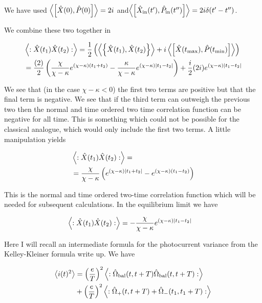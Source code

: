 \documentclass[12pt]{article}
\begin{document}
We have used $\Braket{\left[\hat{X}(0),\hat{P}(0) \right]} = 2i $ and$\Braket{\left[\hat{X}_{\text{in}}(t'),\hat{P}_{\text{in}}(t'') \right]} = 2i \delta(t' - t'')$.

We combine these two together in 

\begin{align}
&\Braket{:\hat{X}(t_1)\hat{X}(t_2) :} = \frac{1}{2}\left(\Braket{\left\{\hat{X}(t_1),\hat{X}(t_2) \right\}} + i \Braket{\left[\hat{X}(t_\text{max}),\hat{P}(t_{\text{min}}) \right]} \right)\\
&= \frac{(2)}{2}\left(\frac{\chi}{\chi-\kappa}e^{(\chi-\kappa)(t_1+t_2)} - \frac{\kappa}{\chi-\kappa} e^{(\chi-\kappa)|t_1-t_2|} \right) + \frac{i}{2}(2i) e^{(\chi-\kappa)|t_1-t_2|}\\
\end{align}

We see that (in the case $\chi-\kappa <0$) the first two terms are positive but that the final term is negative. We see that if the third term can outweigh the previous two then the normal and time ordered two time correlation function can be negative for all time. This is something which could not be possible for the classical analogue, which would only include the first two terms. A little manipulation yields

\begin{align}
&\Braket{:\hat{X}(t_1)\hat{X}(t_2) :} = \\
&= \frac{\chi}{\chi-\kappa} \left(e^{(\chi-\kappa)|t_1+t_2|} - e^{(\chi-\kappa)(t_1-t_2)} \right)
\end{align}

This is the normal and time ordered two-time correlation function which will be needed for subsequent calculations. In the equilibrium limit we have


\begin{align}
&\Braket{:\hat{X}(t_1)\hat{X}(t_2) :} = -\frac{\chi}{\chi-\kappa} e^{(\chi-\kappa)|t_1-t_2|}
\end{align}

Here I will recall an intermediate formula for the photocurrent variance from the Kelley-Kleiner formula write up. We have

\begin{align}
\Braket{i(t)^2} &= \left(\frac{e}{T}\right)^2 \Braket{:\hat{\Omega}_{\text{bal}}(t,t+T)\hat{\Omega}_{\text{bal}}(t,t+T):}\\
&+\left(\frac{e}{T}\right)^2\Braket{:\hat{\Omega}_+(t,t+T) + \hat{\Omega}_-(t_1,t_1+T) :}
\end{align}
\end{document}
